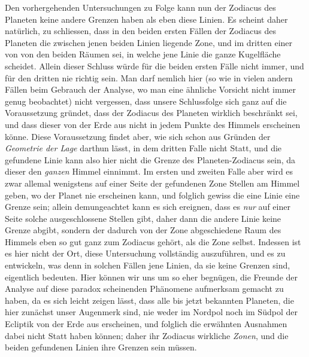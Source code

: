 Den vorhergehenden Untersuchungen zu Folge kann nun der Zodiacus des
Planeten keine andere Grenzen haben als eben diese Linien. Es scheint daher
natürlich, zu schliessen, dass in den beiden ersten Fällen der Zodiacus des Planeten
die zwischen jenen beiden Linien liegende Zone, und im dritten einer von
von den beiden Räumen sei, in welche jene Linie die ganze Kugelfläche scheidet.
Allein dieser Schluss würde für die beiden ersten Fälle nicht immer, und
für den dritten nie richtig sein. Man darf nemlich hier (so wie in vielen andern
Fällen beim Gebrauch der Analyse, wo man eine ähnliche Vorsicht nicht immer
genug beobachtet) nicht vergessen, dass unsere Schlussfolge sich ganz auf die
Voraussetzung gründet, dass der Zodiacus des Planeten wirklich beschränkt sei,
und dass dieser von der Erde aus nicht in jedem Punkte des Himmels erscheinen
könne. Diese Voraussetzung findet aber, wie sich schon aus Gründen der \textit{Geometrie
der Lage} darthun lässt, in dem dritten Falle nicht Statt, und die gefundene
Linie kann also hier nicht die Grenze des Planeten-Zodiacus sein, da dieser
den \textit{ganzen} Himmel einnimmt. Im ersten und zweiten Falle aber wird es
zwar allemal wenigstens auf einer Seite der gefundenen Zone Stellen am Himmel
geben, wo der Planet nie erscheinen kann, und folglich gewiss die eine Linie
eine Grenze sein; allein demungeachtet kann es sich ereignen, dass es \textit{nur} auf
einer Seite solche ausgeschlossene Stellen gibt, daher dann die andere Linie keine
Grenze abgibt, sondern der dadurch von der Zone abgeschiedene Raum des Himmels
eben so gut ganz zum Zodiacus gehört, als die Zone selbst. Indessen
ist es hier nicht der Ort, diese Untersuchung vollständig auszuführen, und es
zu entwickeln, was denn in solchen Fällen jene Linien, da sie keine Grenzen
sind, eigentlich bedeuten. Hier können wir uns um so eher begnügen, die
Freunde der Analyse auf diese paradox scheinenden Phänomene aufmerksam gemacht
zu haben, da es sich leicht zeigen lässt, dass alle bis jetzt bekannten Planeten,
die hier zunächst unser Augenmerk sind, nie weder im Nordpol noch im
Südpol der Ecliptik von der Erde aus erscheinen, und folglich die erwähnten
Ausnahmen dabei nicht Statt haben können; daher ihr Zodiacus wirkliche \textit{Zonen},
und die beiden gefundenen Linien ihre Grenzen sein müssen.

